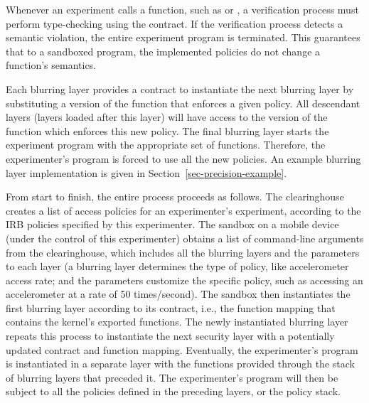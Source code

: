 Whenever an experiment calls a function, such as 
or , a verification process must perform 
type-checking using the contract. If the verification process 
detects a semantic violation,  the entire experiment program is 
terminated. This guarantees that to a sandboxed program, 
the implemented policies do not change a function's semantics.


Each blurring layer provides a contract to instantiate the 
next blurring layer by substituting a version of the function that 
enforces a given policy. All descendant layers (layers loaded 
after this layer) will have access to the version of the function 
which enforces this new policy. The final blurring layer starts the 
experiment program with the appropriate set of functions. 
Therefore, the experimenter's program is forced to use all the 
new policies. An example blurring layer implementation is given in 
Section~\ref{sec-precision-example}.  

\bigskip
From start to finish, the entire process proceeds as follows. 
The clearinghouse creates a list of access policies for an experimenter's
experiment, according to the IRB policies specified by this 
experimenter. The sandbox on a mobile device (under the control of
this experimenter) obtains a list of command-line arguments 
from the clearinghouse, which includes all the blurring layers
and the parameters to each layer (a blurring layer determines
the type of policy, like accelerometer access rate; and the 
parameters customize the specific policy, such as accessing
an accelerometer at a rate of 50 times/second). 
The sandbox then %
instantiates 
the first blurring layer according to its contract, i.e., the function 
mapping that contains the kernel's exported functions.
The newly instantiated blurring layer repeats this process 
to instantiate the next
security layer with a potentially updated contract and function
mapping. Eventually, the experimenter's program is instantiated
in a separate layer with the functions provided
through the stack of blurring layers that preceded it.
The experimenter's program will then be subject to all the 
policies defined in the preceding layers, or the policy stack.

